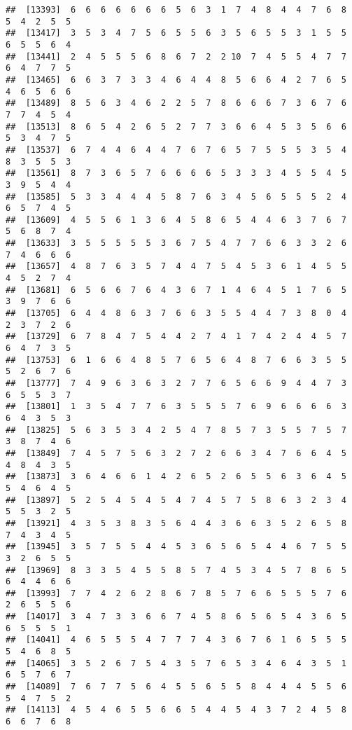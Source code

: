 \documentclass[
]{book}
\begin{document}
\begin{verbatim}
##  [13393]  6  6  6  6  6  6  6  5  6  3  1  7  4  8  4  4  7  6  8  5  4  2  5  5
##  [13417]  3  5  3  4  7  5  6  5  5  6  3  5  6  5  5  3  1  5  5  6  5  5  6  4
##  [13441]  2  4  5  5  5  6  8  6  7  2  2 10  7  4  5  5  4  7  7  6  4  7  7  5
##  [13465]  6  6  3  7  3  3  4  6  4  4  8  5  6  6  4  2  7  6  5  4  6  5  6  6
##  [13489]  8  5  6  3  4  6  2  2  5  7  8  6  6  6  7  3  6  7  6  7  7  4  5  4
##  [13513]  8  6  5  4  2  6  5  2  7  7  3  6  6  4  5  3  5  6  6  5  3  4  7  5
##  [13537]  6  7  4  4  6  4  4  7  6  7  6  5  7  5  5  5  3  5  4  8  3  5  5  3
##  [13561]  8  7  3  6  5  7  6  6  6  6  5  3  3  3  4  5  5  4  5  3  9  5  4  4
##  [13585]  5  3  3  4  4  4  5  8  7  6  3  4  5  6  5  5  5  2  4  6  5  7  4  5
##  [13609]  4  5  5  6  1  3  6  4  5  8  6  5  4  4  6  3  7  6  7  5  6  8  7  4
##  [13633]  3  5  5  5  5  5  3  6  7  5  4  7  7  6  6  3  3  2  6  7  4  6  6  6
##  [13657]  4  8  7  6  3  5  7  4  4  7  5  4  5  3  6  1  4  5  5  4  5  2  7  4
##  [13681]  6  5  6  6  7  6  4  3  6  7  1  4  6  4  5  1  7  6  5  3  9  7  6  6
##  [13705]  6  4  4  8  6  3  7  6  6  3  5  5  4  4  7  3  8  0  4  2  3  7  2  6
##  [13729]  6  7  8  4  7  5  4  4  2  7  4  1  7  4  2  4  4  5  7  6  4  7  3  5
##  [13753]  6  1  6  6  4  8  5  7  6  5  6  4  8  7  6  6  3  5  5  5  2  6  7  6
##  [13777]  7  4  9  6  3  6  3  2  7  7  6  5  6  6  9  4  4  7  3  6  5  5  3  7
##  [13801]  1  3  5  4  7  7  6  3  5  5  5  7  6  9  6  6  6  6  3  6  4  3  5  3
##  [13825]  5  6  3  5  3  4  2  5  4  7  8  5  7  3  5  5  7  5  7  3  8  7  4  6
##  [13849]  7  4  5  7  5  6  3  2  7  2  6  6  3  4  7  6  6  4  5  4  8  4  3  5
##  [13873]  3  6  4  6  6  1  4  2  6  5  2  6  5  5  6  3  6  4  5  5  4  6  4  5
##  [13897]  5  2  5  4  5  4  5  4  7  4  5  7  5  8  6  3  2  3  4  5  5  3  2  5
##  [13921]  4  3  5  3  8  3  5  6  4  4  3  6  6  3  5  2  6  5  8  7  4  3  4  5
##  [13945]  3  5  7  5  5  4  4  5  3  6  5  6  5  4  4  6  7  5  5  3  2  6  5  5
##  [13969]  8  3  3  5  4  5  5  8  5  7  4  5  3  4  5  7  8  6  5  6  4  4  6  6
##  [13993]  7  7  4  2  6  2  8  6  7  8  5  7  6  6  5  5  5  7  6  2  6  5  5  6
##  [14017]  3  4  7  3  3  6  6  7  4  5  8  6  5  6  5  4  3  6  5  6  5  5  5  1
##  [14041]  4  6  5  5  5  4  7  7  7  4  3  6  7  6  1  6  5  5  5  5  4  6  8  5
##  [14065]  3  5  2  6  7  5  4  3  5  7  6  5  3  4  6  4  3  5  1  6  5  7  6  7
##  [14089]  7  6  7  7  5  6  4  5  5  6  5  5  8  4  4  4  5  5  6  5  4  7  5  2
##  [14113]  4  5  4  6  5  5  6  6  5  4  4  5  4  3  7  2  4  5  8  6  6  7  6  8

\end{verbatim}
\end{document}
